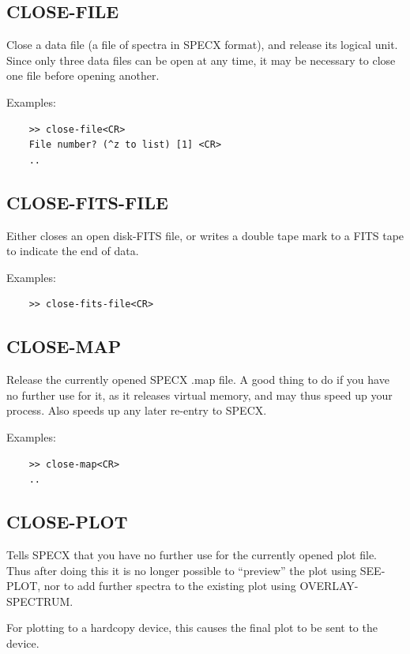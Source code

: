 \documentclass[11pt,twoside]{report}
\begin{document}
\subsection{CLOSE-FILE} 

Close a data file (\ie a file of spectra in SPECX format), and release
its logical unit. Since only three data files can be open at any time, it
may be necessary to close one file before opening another.

Examples:
\begin{verbatim}
    >> close-file<CR>
    File number? (^z to list) [1] <CR>
    ..
\end{verbatim}

\subsection{CLOSE-FITS-FILE} 

Either closes an open disk-FITS file, or writes a double tape mark
to a FITS tape to indicate the end of data.

Examples:
\begin{verbatim}
    >> close-fits-file<CR>
\end{verbatim}

\subsection{CLOSE-MAP} 

Release the currently opened SPECX .map file. A good thing to do if
you have no further use for it, as it releases virtual memory, and may thus
speed up your process. Also speeds up any later re-entry to SPECX.

Examples:
\begin{verbatim}
    >> close-map<CR>
    ..
\end{verbatim}

\subsection{CLOSE-PLOT} 

Tells SPECX that you have no further use for the currently opened plot file.
Thus after doing this it is no longer possible to ``preview'' the plot using
SEE-PLOT, nor to add further spectra to the existing plot using OVERLAY-SPECTRUM.

For plotting to a hardcopy device, this causes the final plot to be sent to
the device.
\end{document}
